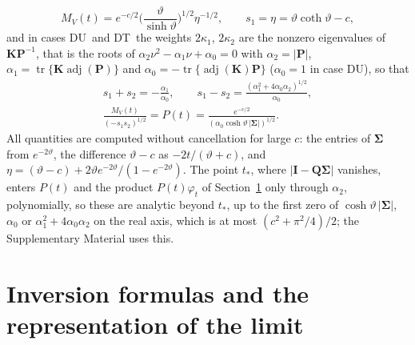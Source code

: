 \documentclass[ecta,nameyear,final]{econsocart}
\newcommand{\tr}{\operatorname{tr}}
\newcommand{\adj}{\operatorname{adj}}
\newcommand{\Fu}{\textsf{\upshape DU}}
\newcommand{\Ft}{\textsf{\upshape DT}}
\newcommand{\bQ}{\boldsymbol{Q}}
\newcommand{\bK}{\boldsymbol{K}}
\newcommand{\bI}{\boldsymbol{I}}
\newcommand{\bSig}{\boldsymbol{\Sigma}}
\newcommand{\bP}{\boldsymbol{P}}
\theoremstyle{plain}
\theoremstyle{definition}
\begin{document}
\begin{equation}
M_V(t)=e^{-c/2}\Big(\frac{\vartheta}{\sinh\vartheta}\Big)^{1/2}\eta^{-1/2},\qquad s_1=\eta=\vartheta\coth\vartheta-c,
\label{eq:dkgirs}
\end{equation}
and in cases \Fu\ and \Ft\ the weights $2\kappa_1$, $2\kappa_2$ are the nonzero eigenvalues of $\bK\bP^{-1}$, that is the roots of $\alpha_2\nu^2-\alpha_1\nu+\alpha_0=0$ with $\alpha_2=|\bP|$, $\alpha_1=\tr\{\bK\adj(\bP)\}$ and $\alpha_0=-\tr\{\adj(\bK)\bP\}$ ($\alpha_0=1$ in case \Fu), so that
\begin{equation}
\begin{gathered}
s_1+s_2=-\frac{\alpha_1}{\alpha_0},\qquad s_1-s_2=\frac{(\alpha_1^2+4\alpha_0\alpha_2)^{1/2}}{\alpha_0},\\
\frac{M_V(t)}{(-s_1s_2)^{1/2}}=P(t)=\frac{e^{-c/2}}{(\alpha_0\cosh\vartheta\,|\bSig|)^{1/2}}.
\end{gathered}
\label{eq:dugirs}
\end{equation}
All quantities are computed without cancellation for large $c$: the entries of $\bSig$ from $e^{-2\vartheta}$, the difference $\vartheta-c$ as $-2t/(\vartheta+c)$, and $\eta=(\vartheta-c)+2\vartheta e^{-2\vartheta}/(1-e^{-2\vartheta})$.  The point $t_*$, where $|\bI-\bQ\bSig|$ vanishes, enters $P(t)$ and the product $P(t)\varphi_t$ of Section~\ref{sec:inv} only through $\alpha_2$, polynomially, so these are analytic beyond $t_*$, up to the first zero of $\cosh\vartheta\,|\bSig|$, $\alpha_0$ or $\alpha_1^2+4\alpha_0\alpha_2$ on the real axis, which is at most $(c^2+\pi^2/4)/2$; the Supplementary Material uses this.
\section{Inversion formulas and the representation of the limit}
\label{sec:inv}
\end{document}
